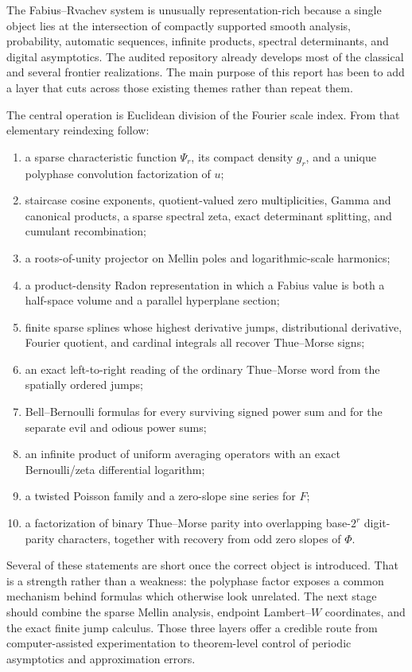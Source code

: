 \documentclass[11pt]{article}
\theoremstyle{definition}
\theoremstyle{remark}
\begin{document}
The Fabius--Rvachev system is unusually representation-rich because a single
object lies at the intersection of compactly supported smooth analysis,
probability, automatic sequences, infinite products, spectral determinants,
and digital asymptotics.  The audited repository already develops most of the
classical and several frontier realizations.  The main purpose of this report
has been to add a layer that cuts across those existing themes rather than
repeat them.

The central operation is Euclidean division of the Fourier scale index.  From
that elementary reindexing follow:
\begin{enumerate}
\item a sparse characteristic function $\Psi_r$, its compact density $g_r$,
      and a unique polyphase convolution factorization of $u$;
\item staircase cosine exponents, quotient-valued zero multiplicities,
      Gamma and canonical products, a sparse spectral zeta, exact determinant
      splitting, and cumulant recombination;
\item a roots-of-unity projector on Mellin poles and logarithmic-scale
      harmonics;
\item a product-density Radon representation in which a Fabius value is both a
      half-space volume and a parallel hyperplane section;
\item finite sparse splines whose highest derivative jumps, distributional
      derivative, Fourier quotient, and cardinal integrals all recover
      Thue--Morse signs;
\item an exact left-to-right reading of the ordinary Thue--Morse word from the
      spatially ordered jumps;
\item Bell--Bernoulli formulas for every surviving signed power sum and for the
      separate evil and odious power sums;
\item an infinite product of uniform averaging operators with an exact
      Bernoulli/zeta differential logarithm;
\item a twisted Poisson family and a zero-slope sine series for $F$;
\item a factorization of binary Thue--Morse parity into overlapping
      base-$2^r$ digit-parity characters, together with recovery from odd zero
      slopes of $\Phi$.
\end{enumerate}

Several of these statements are short once the correct object is introduced.
That is a strength rather than a weakness: the polyphase factor exposes a
common mechanism behind formulas which otherwise look unrelated.  The next
stage should combine the sparse Mellin analysis, endpoint Lambert--$W$
coordinates, and the exact finite jump calculus.  Those three layers offer a
credible route from computer-assisted experimentation to theorem-level control
of periodic asymptotics and approximation errors.
\end{document}
